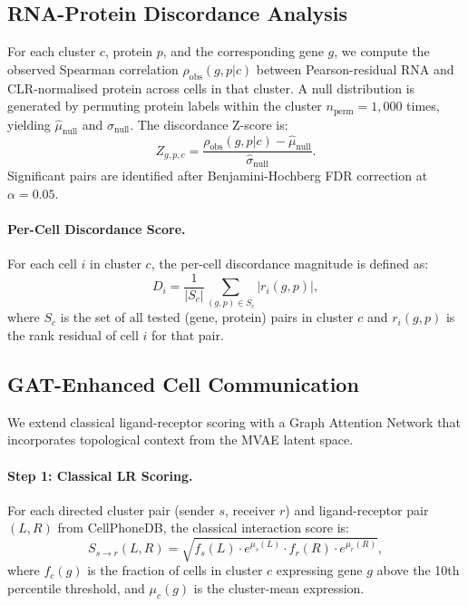 \documentclass[11pt,a4paper]{article}
\begin{document}
\subsection{RNA-Protein Discordance Analysis}\label{ssec:discordance}

For each cluster $c$, protein $p$, and the corresponding gene $g$, we compute the observed Spearman correlation $\rho_\text{obs}(g,p|c)$ between Pearson-residual RNA and CLR-normalised protein across cells in that cluster.
A null distribution is generated by permuting protein labels within the cluster $n_\text{perm}=1{,}000$ times, yielding $\hat{\mu}_\text{null}$ and $\hat{\sigma}_\text{null}$.
The discordance Z-score is:
\begin{equation}\label{eq:zscore}
  Z_{g,p,c} = \frac{\rho_\text{obs}(g,p|c) - \hat{\mu}_\text{null}}{\hat{\sigma}_\text{null}}.
\end{equation}
Significant pairs are identified after Benjamini-Hochberg FDR correction at $\alpha=0.05$.

\paragraph{Per-Cell Discordance Score.}
For each cell $i$ in cluster $c$, the per-cell discordance magnitude is defined as:
\begin{equation}\label{eq:cell_discord}
  D_i = \frac{1}{|S_c|}\sum_{(g,p)\in S_c} |r_i(g,p)|,
\end{equation}
where $S_c$ is the set of all tested (gene, protein) pairs in cluster $c$ and $r_i(g,p)$ is the rank residual of cell $i$ for that pair.

\subsection{GAT-Enhanced Cell Communication}\label{ssec:gat}

We extend classical ligand-receptor scoring with a Graph Attention Network that incorporates topological context from the MVAE latent space.

\paragraph{Step 1: Classical LR Scoring.}
For each directed cluster pair (sender $s$, receiver $r$) and ligand-receptor pair $(L, R)$ from CellPhoneDB, the classical interaction score is:
\begin{equation}\label{eq:lr_score}
  S_{s\to r}(L,R) = \sqrt{f_s(L)\cdot e^{\mu_s(L)}\cdot f_r(R)\cdot e^{\mu_r(R)}},
\end{equation}
where $f_c(g)$ is the fraction of cells in cluster $c$ expressing gene $g$ above the 10th percentile threshold, and $\mu_c(g)$ is the cluster-mean expression.
\end{document}

